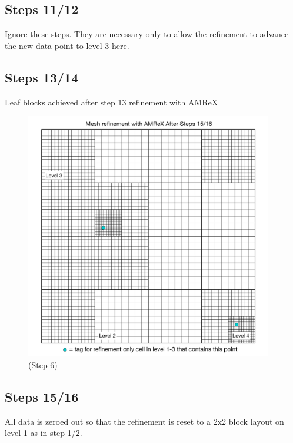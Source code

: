 \documentclass[12pt,letterpaper]{article}
\begin{document}
\newpage
\subsection{Steps 11/12}
Ignore these steps.  They are necessary only to allow the refinement to advance
the new data point to level 3 here.

\subsection{Steps 13/14}
Leaf blocks achieved after step 13 refinement with AMReX
\begin{figure}[!hp]
\begin{center}
\includegraphics[width=4.25in]{TestRefine_Step14_Both.pdf}
\caption{(Step 6) }
\end{center}
\end{figure}

\newpage
\subsection{Steps 15/16}
All data is zeroed out so that the refinement is reset to a 2x2 block layout on
level 1 as in step 1/2.
\end{document}
